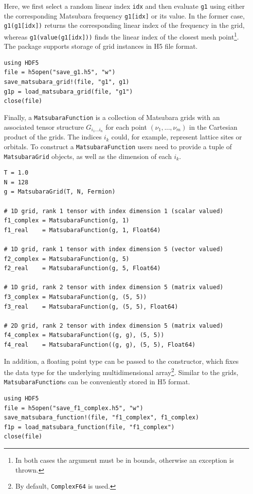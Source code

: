 \documentclass{SciPost}
\begin{document}
%
Here, we first select a random linear index \texttt{idx} and then evaluate \texttt{g1} using either the corresponding Matsubara frequency \texttt{g1[idx]} or its value. In the former case, \texttt{g1(g1[idx])} returns the corresponding linear index of the frequency in the grid, whereas \texttt{g1(value(g1[idx]))} finds the linear index of the closest mesh point\footnote{ In both cases the argument must be in bounds, otherwise an exception is thrown.}. The package supports storage of grid instances in H5 file format.
%
\begin{verbatim}
using HDF5
file = h5open("save_g1.h5", "w")
save_matsubara_grid!(file, "g1", g1) 
g1p = load_matsubara_grid(file, "g1")
close(file)
\end{verbatim}
%
Finally, a \texttt{MatsubaraFunction} is a collection of Matsubara grids with an associated tensor structure $G_{i_1 ... i_n}$ for each point $(\nu_1, ..., \nu_m)$ in the Cartesian product of the grids. The indices $i_k$ could, for example, represent lattice sites or orbitals. To construct a \texttt{MatsubaraFunction} users need to provide a tuple of \texttt{MatsubaraGrid} objects, as well as the dimension of each $i_k$.
%
\begin{verbatim}
T = 1.0
N = 128
g = MatsubaraGrid(T, N, Fermion)

# 1D grid, rank 1 tensor with index dimension 1 (scalar valued)
f1_complex = MatsubaraFunction(g, 1) 
f1_real    = MatsubaraFunction(g, 1, Float64) 

# 1D grid, rank 1 tensor with index dimension 5 (vector valued)
f2_complex = MatsubaraFunction(g, 5) 
f2_real    = MatsubaraFunction(g, 5, Float64) 

# 1D grid, rank 2 tensor with index dimension 5 (matrix valued)
f3_complex = MatsubaraFunction(g, (5, 5)) 
f3_real    = MatsubaraFunction(g, (5, 5), Float64) 

# 2D grid, rank 2 tensor with index dimension 5 (matrix valued)
f4_complex = MatsubaraFunction((g, g), (5, 5)) 
f4_real    = MatsubaraFunction((g, g), (5, 5), Float64)
\end{verbatim}
%
In addition, a floating point type can be passed to the constructor, which fixes the data type for the underlying multidimensional array\footnote{ By default, \texttt{ComplexF64} is used.}. Similar to the grids, \texttt{MatsubaraFunction}s can be conveniently stored in H5 format.
%
\begin{verbatim}
using HDF5
file = h5open("save_f1_complex.h5", "w")
save_matsubara_function!(file, "f1_complex", f1_complex)
f1p = load_matsubara_function(file, "f1_complex")
close(file)
\end{verbatim}
\end{document}
